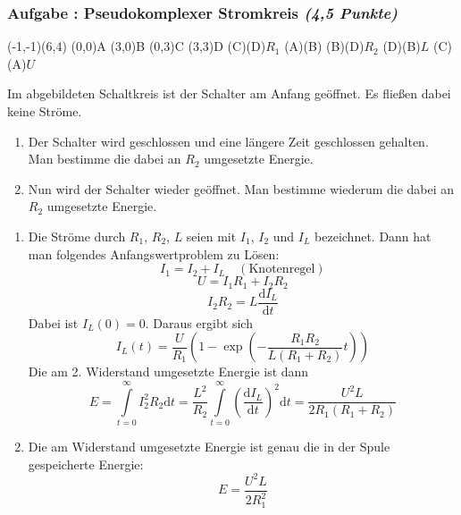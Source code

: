 \documentclass[12pt,a4paper]{article}
\newcommand{\dif}{\mathrm{d}}
\newcommand{\tdif}[2]{\frac{\dif#1}{\dif#2}}
\newenvironment{abcenum}{\renewcommand{\labelenumi}{(\alph{enumi})} \begin{enumerate}}{\end{enumerate}\renewcommand{\labelenumi}{\theenumi .}}
\newcommand{\skizze}[1]{
\begin{center}
#1
\end{center}
}
\newcounter{numlabel}
\newenvironment{problem}[2]{\stepcounter{numlabel} \vspace{1ex} \subsubsection*{Aufgabe \the\value{numlabel}: #1 \emph{(#2 Punkte)}} \renewcommand{\Currentlabel}{Aufgabe \the\value{numlabel}: #1}}{

}
\begin{document}
\begin{problem}{Pseudokomplexer Stromkreis}{4,5}
\skizze{
\begin{pspicture}(-1,-1)(6,4)
\pnode(0,0){A}
\pnode(3,0){B}
\pnode(0,3){C}
\pnode(3,3){D}
\resistor(C)(D){$R_1$}
\switch(A)(B){}
\resistor(B)(D){$R_2$}
\coil[parallel,labeloffset=1](D)(B){$L$}
\battery[labeloffset=1](C)(A){$U$}
\end{pspicture}
}
Im abgebildeten Schaltkreis ist der Schalter am Anfang geöffnet. Es fließen dabei keine Ströme.
\begin{abcenum}
\item Der Schalter wird geschlossen und eine längere Zeit geschlossen gehalten. Man bestimme die dabei an $R_2$ umgesetzte Energie.
\item Nun wird der Schalter wieder geöffnet. Man bestimme wiederum die dabei an $R_2$ umgesetzte Energie.
\end{abcenum}

\begin{solution}
\begin{abcenum}
\item Die Ströme durch $R_1$, $R_2$, $L$ seien mit $I_1$, $I_2$ und $I_L$ bezeichnet. Dann hat man folgendes Anfangswertproblem zu Lösen:
\[
I_1 = I_2 + I_L \quad \mathrm{(Knotenregel)}
\]
\[
U = I_1 R_1 + I_2 R_2
\]
\[
I_2 R_2 = L \tdif{I_L}{t}
\]
Dabei ist $I_L(0)=0$. Daraus ergibt sich
\[
I_L(t) = \frac{U}{R_1} \left( 1-\exp\left( -\frac{R_1 R_2}{L (R_1+R_2)} t \right) \right)
\]
Die am 2. Widerstand umgesetzte Energie ist dann
\[
E = \int\limits_{t=0}^{\infty} I_2^2 R_2 \dif t
= \frac{L^2}{R_2} \int\limits_{t=0}^{\infty} \left( \tdif{I_L}{t} \right)^2 \dif t
= \frac{U^2 L}{2 R_1 (R_1+R_2)}
\]
\item Die am Widerstand umgesetzte Energie ist genau die in der Spule gespeicherte Energie:
\[
E = \frac{U^2 L}{2 R_1^2}
\]
\end{abcenum}
\end{solution}
\end{problem}
\end{document}
